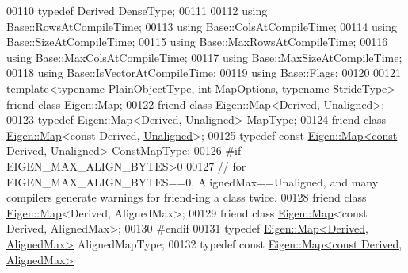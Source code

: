 \begin{DoxyCode}
00110     \textcolor{keyword}{typedef} Derived DenseType;
00111 
00112     \textcolor{keyword}{using} Base::RowsAtCompileTime;
00113     \textcolor{keyword}{using} Base::ColsAtCompileTime;
00114     \textcolor{keyword}{using} Base::SizeAtCompileTime;
00115     \textcolor{keyword}{using} Base::MaxRowsAtCompileTime;
00116     \textcolor{keyword}{using} Base::MaxColsAtCompileTime;
00117     \textcolor{keyword}{using} Base::MaxSizeAtCompileTime;
00118     \textcolor{keyword}{using} Base::IsVectorAtCompileTime;
00119     \textcolor{keyword}{using} Base::Flags;
00120 
00121     \textcolor{keyword}{template}<\textcolor{keyword}{typename} PlainObjectType, \textcolor{keywordtype}{int} MapOptions, \textcolor{keyword}{typename} Str\textcolor{keywordtype}{id}eType> \textcolor{keyword}{friend} \textcolor{keyword}{class }
      \hyperlink{group___core___module_class_eigen_1_1_map}{Eigen::Map};
00122     \textcolor{keyword}{friend}  \textcolor{keyword}{class }\hyperlink{group___core___module_class_eigen_1_1_map}{Eigen::Map}<Derived, \hyperlink{group__enums_gga45fe06e29902b7a2773de05ba27b47a1ac935220b4c844108e183ebe30a4d5204}{Unaligned}>;
00123     \textcolor{keyword}{typedef} \hyperlink{group___core___module_class_eigen_1_1_map}{Eigen::Map<Derived, Unaligned>}  
      \hyperlink{group___core___module_class_eigen_1_1_map}{MapType};
00124     \textcolor{keyword}{friend}  \textcolor{keyword}{class }\hyperlink{group___core___module_class_eigen_1_1_map}{Eigen::Map}<const Derived, \hyperlink{group__enums_gga45fe06e29902b7a2773de05ba27b47a1ac935220b4c844108e183ebe30a4d5204}{Unaligned}>;
00125     \textcolor{keyword}{typedef} \textcolor{keyword}{const} \hyperlink{group___core___module_class_eigen_1_1_map}{Eigen::Map<const Derived, Unaligned>} ConstMapType;
00126 \textcolor{preprocessor}{#if EIGEN\_MAX\_ALIGN\_BYTES>0}
00127     \textcolor{comment}{// for EIGEN\_MAX\_ALIGN\_BYTES==0, AlignedMax==Unaligned, and many compilers generate warnings for
       friend-ing a class twice.}
00128     \textcolor{keyword}{friend}  \textcolor{keyword}{class }\hyperlink{group___core___module_class_eigen_1_1_map}{Eigen::Map}<Derived, AlignedMax>;
00129     \textcolor{keyword}{friend}  \textcolor{keyword}{class }\hyperlink{group___core___module_class_eigen_1_1_map}{Eigen::Map}<const Derived, AlignedMax>;
00130 \textcolor{preprocessor}{#endif}
00131     \textcolor{keyword}{typedef} \hyperlink{group___core___module_class_eigen_1_1_map}{Eigen::Map<Derived, AlignedMax>} AlignedMapType;
00132     \textcolor{keyword}{typedef} \textcolor{keyword}{const} \hyperlink{group___core___module_class_eigen_1_1_map}{Eigen::Map<const Derived, AlignedMax>} 

\end{DoxyCode}
